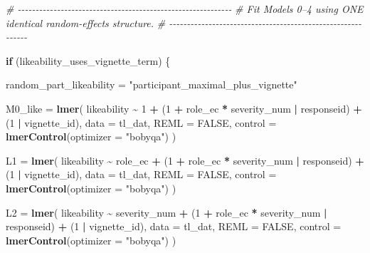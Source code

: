 \documentclass[
]{article}
\newenvironment{Shaded}{\begin{snugshade}}{\end{snugshade}}
\newcommand{\AttributeTok}[1]{\textcolor[rgb]{0.13,0.29,0.53}{#1}}
\newcommand{\CommentTok}[1]{\textcolor[rgb]{0.56,0.35,0.01}{\textit{#1}}}
\newcommand{\ConstantTok}[1]{\textcolor[rgb]{0.56,0.35,0.01}{#1}}
\newcommand{\ControlFlowTok}[1]{\textcolor[rgb]{0.13,0.29,0.53}{\textbf{#1}}}
\newcommand{\DecValTok}[1]{\textcolor[rgb]{0.00,0.00,0.81}{#1}}
\newcommand{\FunctionTok}[1]{\textcolor[rgb]{0.13,0.29,0.53}{\textbf{#1}}}
\newcommand{\NormalTok}[1]{#1}
\newcommand{\OtherTok}[1]{\textcolor[rgb]{0.56,0.35,0.01}{#1}}
\newcommand{\SpecialCharTok}[1]{\textcolor[rgb]{0.81,0.36,0.00}{\textbf{#1}}}
\newcommand{\StringTok}[1]{\textcolor[rgb]{0.31,0.60,0.02}{#1}}
\begin{document}
\begin{Shaded}
\begin{Highlighting}[]
\CommentTok{\# {-}{-}{-}{-}{-}{-}{-}{-}{-}{-}{-}{-}{-}{-}{-}{-}{-}{-}{-}{-}{-}{-}{-}{-}{-}{-}{-}{-}{-}{-}{-}{-}{-}{-}{-}{-}{-}{-}{-}{-}{-}{-}{-}{-}{-}{-}{-}{-}{-}{-}{-}{-}{-}{-}{-}{-}{-}{-}{-}{-}}
\CommentTok{\# Fit Models 0–4 using ONE identical random{-}effects structure.}
\CommentTok{\# {-}{-}{-}{-}{-}{-}{-}{-}{-}{-}{-}{-}{-}{-}{-}{-}{-}{-}{-}{-}{-}{-}{-}{-}{-}{-}{-}{-}{-}{-}{-}{-}{-}{-}{-}{-}{-}{-}{-}{-}{-}{-}{-}{-}{-}{-}{-}{-}{-}{-}{-}{-}{-}{-}{-}{-}{-}{-}{-}{-}}

\ControlFlowTok{if}\NormalTok{ (likeability\_uses\_vignette\_term) \{}

\NormalTok{  random\_part\_likeability }\OtherTok{=} \StringTok{"participant\_maximal\_plus\_vignette"}

\NormalTok{  M0\_like }\OtherTok{=} \FunctionTok{lmer}\NormalTok{(}
\NormalTok{    likeability }\SpecialCharTok{\textasciitilde{}} \DecValTok{1} \SpecialCharTok{+}
\NormalTok{      (}\DecValTok{1} \SpecialCharTok{+}\NormalTok{ role\_ec }\SpecialCharTok{*}\NormalTok{ severity\_num }\SpecialCharTok{|}\NormalTok{ responseid) }\SpecialCharTok{+}
\NormalTok{      (}\DecValTok{1} \SpecialCharTok{|}\NormalTok{ vignette\_id),}
    \AttributeTok{data =}\NormalTok{ tl\_dat,}
    \AttributeTok{REML =} \ConstantTok{FALSE}\NormalTok{,}
    \AttributeTok{control =} \FunctionTok{lmerControl}\NormalTok{(}\AttributeTok{optimizer =} \StringTok{"bobyqa"}\NormalTok{)}
\NormalTok{  )}

\NormalTok{  L1 }\OtherTok{=} \FunctionTok{lmer}\NormalTok{(}
\NormalTok{    likeability }\SpecialCharTok{\textasciitilde{}}\NormalTok{ role\_ec }\SpecialCharTok{+}
\NormalTok{      (}\DecValTok{1} \SpecialCharTok{+}\NormalTok{ role\_ec }\SpecialCharTok{*}\NormalTok{ severity\_num }\SpecialCharTok{|}\NormalTok{ responseid) }\SpecialCharTok{+}
\NormalTok{      (}\DecValTok{1} \SpecialCharTok{|}\NormalTok{ vignette\_id),}
    \AttributeTok{data =}\NormalTok{ tl\_dat,}
    \AttributeTok{REML =} \ConstantTok{FALSE}\NormalTok{,}
    \AttributeTok{control =} \FunctionTok{lmerControl}\NormalTok{(}\AttributeTok{optimizer =} \StringTok{"bobyqa"}\NormalTok{)}
\NormalTok{  )}

\NormalTok{  L2 }\OtherTok{=} \FunctionTok{lmer}\NormalTok{(}
\NormalTok{    likeability }\SpecialCharTok{\textasciitilde{}}\NormalTok{ severity\_num }\SpecialCharTok{+}
\NormalTok{      (}\DecValTok{1} \SpecialCharTok{+}\NormalTok{ role\_ec }\SpecialCharTok{*}\NormalTok{ severity\_num }\SpecialCharTok{|}\NormalTok{ responseid) }\SpecialCharTok{+}
\NormalTok{      (}\DecValTok{1} \SpecialCharTok{|}\NormalTok{ vignette\_id),}
    \AttributeTok{data =}\NormalTok{ tl\_dat,}
    \AttributeTok{REML =} \ConstantTok{FALSE}\NormalTok{,}
    \AttributeTok{control =} \FunctionTok{lmerControl}\NormalTok{(}\AttributeTok{optimizer =} \StringTok{"bobyqa"}\NormalTok{)}
\NormalTok{  )}


\end{Highlighting}
\end{Shaded}
\end{document}
